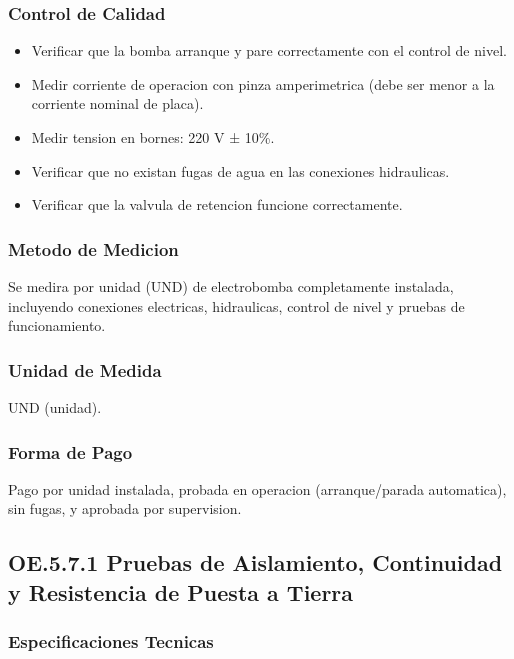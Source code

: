 \subsubsection{Control de Calidad}

\begin{itemize}
  \item Verificar que la bomba arranque y pare correctamente con el control de nivel.
  \item Medir corriente de operacion con pinza amperimetrica (debe ser menor a la corriente nominal de placa).
  \item Medir tension en bornes: 220 V ± 10\%.
  \item Verificar que no existan fugas de agua en las conexiones hidraulicas.
  \item Verificar que la valvula de retencion funcione correctamente.
\end{itemize}

\subsubsection{Metodo de Medicion}

Se medira por unidad (UND) de electrobomba completamente instalada, incluyendo conexiones electricas, hidraulicas, control de nivel y pruebas de funcionamiento.

\subsubsection{Unidad de Medida}

UND (unidad).

\subsubsection{Forma de Pago}

Pago por unidad instalada, probada en operacion (arranque/parada automatica), sin fugas, y aprobada por supervision.

\subsection{OE.5.7.1 Pruebas de Aislamiento, Continuidad y Resistencia de Puesta a Tierra}

\subsubsection{Especificaciones Tecnicas}

